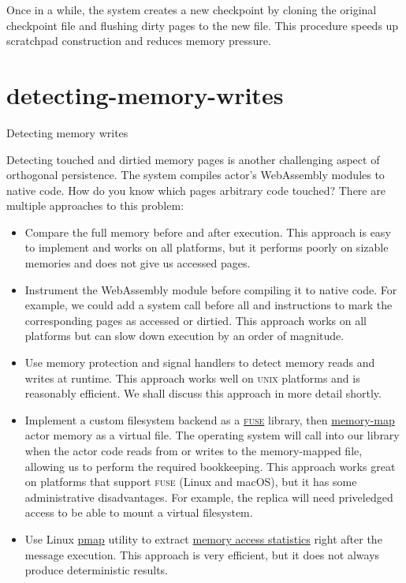 \documentclass{article}
\begin{document}
Once in a while, the system creates a new checkpoint by cloning the original checkpoint file and flushing dirty pages to the new file.
This procedure speeds up scratchpad construction and reduces memory pressure.

\section{detecting-memory-writes}{Detecting memory writes}

Detecting touched and dirtied memory pages is another challenging aspect of orthogonal persistence.
The system compiles actor's WebAssembly modules to native code.
How do you know which pages arbitrary code touched? 
There are multiple approaches to this problem:
\begin{itemize}
  \item 
    Compare the full memory before and after execution.
    This approach is easy to implement and works on all platforms, but it performs poorly on sizable memories and does not give us accessed pages.
  \item 
    Instrument the WebAssembly module before compiling it to native code.
    For example, we could add a system call before all  and  instructions to mark the corresponding pages as accessed or dirtied.
    This approach works on all platforms but can slow down execution by an order of magnitude.
  \item 
    Use memory protection and signal handlers to detect memory reads and writes at runtime.
    This approach works well on \textsc{unix} platforms and is reasonably efficient.
    We shall discuss this approach in more detail shortly.
  \item 
    Implement a custom filesystem backend as a \href{https://en.wikipedia.org/wiki/Filesystem_in_Userspace}{\textsc{fuse}} library, then \href{https://man7.org/linux/man-pages/man2/mmap.2.html}{memory-map} actor memory as a virtual file.
    The operating system will call into our library when the actor code reads from or writes to the memory-mapped file, allowing us to perform the required bookkeeping.
    This approach works great on platforms that support \textsc{fuse} (Linux and macOS), but it has some administrative disadvantages.
    For example, the replica will need priveledged access to be able to mount a virtual filesystem.
  \item 
    Use Linux \href{https://man7.org/linux/man-pages/man1/pmap.1.html}{pmap} utility to extract \href{https://techtalk.intersec.com/2013/07/memory-part-2-understanding-process-memory/#pmap-detailed-mapping}{memory access statistics} right after the message execution.
    This approach is very efficient, but it does not always produce deterministic results.
\end{itemize}
\end{document}
